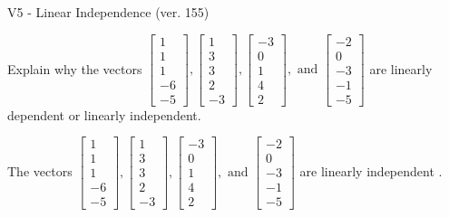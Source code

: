 \begin{exercise}
  \begin{exerciseTitle}V5 - Linear Independence (ver. 155)\end{exerciseTitle}
  \begin{exerciseStatement}
    Explain why the vectors \(\left[\begin{array}{r}
1 \\
1 \\
1 \\
-6 \\
-5
\end{array}\right] , \left[\begin{array}{r}
1 \\
3 \\
3 \\
2 \\
-3
\end{array}\right] , \left[\begin{array}{r}
-3 \\
0 \\
1 \\
4 \\
2
\end{array}\right] , \text{ and } \left[\begin{array}{r}
-2 \\
0 \\
-3 \\
-1 \\
-5
\end{array}\right]\) are linearly dependent or linearly independent.	


  \end{exerciseStatement}
  \begin{exerciseAnswer}
   The vectors \(\left[\begin{array}{r}
1 \\
1 \\
1 \\
-6 \\
-5
\end{array}\right] , \left[\begin{array}{r}
1 \\
3 \\
3 \\
2 \\
-3
\end{array}\right] , \left[\begin{array}{r}
-3 \\
0 \\
1 \\
4 \\
2
\end{array}\right] , \text{ and } \left[\begin{array}{r}
-2 \\
0 \\
-3 \\
-1 \\
-5
\end{array}\right]\) are 
  	 linearly independent  .
  


  \end{exerciseAnswer}
\end{exercise}